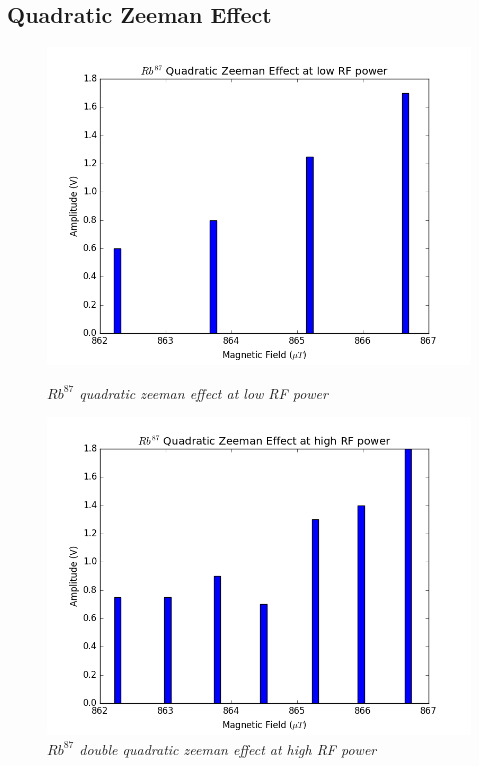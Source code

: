 \documentclass[twocolumn]{article}
\begin{document}
\subsection{Quadratic Zeeman Effect}
\begin{figure}
\begin{minipage}[t]{0.45\linewidth}
\includegraphics[width=\linewidth]{pictures/rb87-low.png}
\caption{\textit{$Rb^{87}$ quadratic zeeman effect at low RF power}}
\label{fig:24}
\end{minipage}
\hfill
\begin{minipage}[t]{0.45\linewidth}
\includegraphics[width=\linewidth]{pictures/rb87-high.png}
\caption{\textit{$Rb^{87}$ double quadratic zeeman effect at high RF power}}

\end{minipage}
\end{figure}
\end{document}
